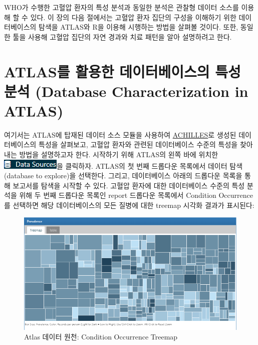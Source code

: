 \documentclass[11pt]{book}
\theoremstyle{definition}
\theoremstyle{definition}
\theoremstyle{definition}
\theoremstyle{remark}
\begin{document}
WHO가 수행한 고혈압 환자의 특성 분석과 동일한 분석은 관찰형 데이터
소스를 이용해 할 수 있다. 이 장의 다음 절에서는 고혈압 환자 집단의
구성을 이해하기 위한 데이터베이스의 탐색을 ATLAS와 R을 이용해 시행하는
방법을 살펴볼 것이다. 또한, 동일한 툴을 사용해 고혈압 집단의 자연 경과와
치료 패턴을 알아 설명하려고 한다.

\section{ATLAS를 활용한 데이터베이스의 특성 분석 (Database
Characterization in
ATLAS)}\label{atlas-----database-characterization-in-atlas}

여기서는 ATLAS에 탑재된 데이터 소스 모듈을 사용하여
\href{https://github.com/OHDSI/Achilles}{ACHILLES}로 생성된
데이터베이스의 특성을 살펴보고, 고혈압 환자와 관련된 데이터베이스 수준의
특성을 찾아내는 방법을 설명하고자 한다. 시작하기 위해 ATLAS의 왼쪽 바에
위치한
\includegraphics{images/Characterization/atlasDataSourcesMenuItem.png}을
클릭하자. ATLAS의 첫 번째 드롭다운 목록에서 데이터 탐색(database to
explore)을 선택한다. 그리고, 데이터베이스 아래의 드롭다운 목록을 통해
보고서를 탐색을 시작할 수 있다. 고혈압 환자에 대한 데이터베이스 수준의
특성 분석을 위해 두 번째 드롭다운 목록인 report 드롭다운 목록에서
Condition Occurrence를 선택하면 해당 데이터베이스의 모든 질병에 대한
treemap 시각화 결과가 표시된다:

\begin{figure}

{\centering \includegraphics[width=1\linewidth]{images/Characterization/atlasDataSourcesConditionTreemap} 

}

\caption{Atlas 데이터 원천: Condition Occurrence Treemap}\label{fig:atlasDataSourcesConditionTreemap}
\end{figure}
\end{document}
